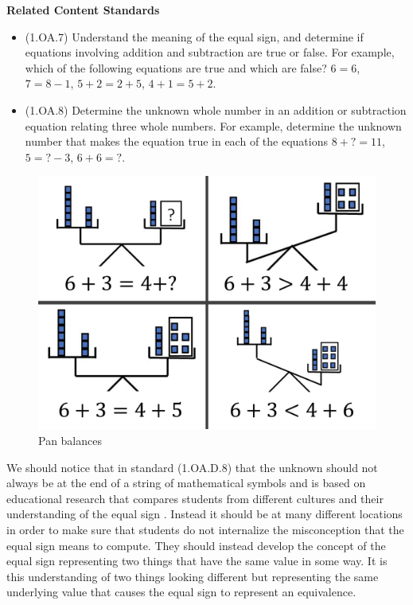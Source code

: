 \documentclass[
]{book}
\providecommand{\tightlist}{%
  \setlength{\itemsep}{0pt}\setlength{\parskip}{0pt}}
\newenvironment{standards}{}{}
\theoremstyle{definition}
\theoremstyle{definition}
\theoremstyle{definition}
\theoremstyle{definition}
\theoremstyle{remark}
\begin{document}
\begin{standards}

\begin{center}
\textbf{Related Content Standards}

\end{center}

\begin{itemize}
\tightlist
\item
  (1.OA.7) Understand the meaning of the equal sign, and determine if equations involving addition and subtraction are true or false. For example, which of the following equations are true and which are false? \(6 = 6\), \(7 = 8 - 1\), \(5 + 2 = 2 + 5\), \(4 + 1 = 5 + 2\).
\item
  (1.OA.8) Determine the unknown whole number in an addition or subtraction equation relating three whole numbers. For example, determine the unknown number that makes the equation true in each of the equations \(8 + ? = 11\), \(5 = ? - 3\), \(6 + 6 = ?\).
\end{itemize}

\end{standards}

\begin{figure}

{\centering \includegraphics[width=0.4\linewidth]{images/balance-scales} 

}

\caption{Pan balances}\label{fig:pan-balance}
\end{figure}

We should notice that in standard (1.OA.D.8) that the unknown should not always be at the end of a string of mathematical symbols and is based on educational research that compares students from different cultures and their understanding of the equal sign \citep[pp.~148-150]{Cognition}. Instead it should be at many different locations in order to make sure that students do not internalize the misconception that the equal sign means to compute. They should instead develop the concept of the equal sign representing two things that have the same value in some way. It is this understanding of two things looking different but representing the same underlying value that causes the equal sign to represent an equivalence.
\end{document}
